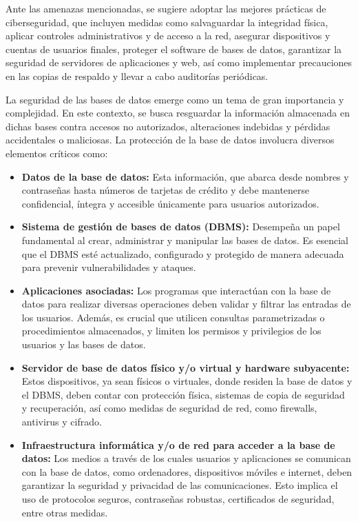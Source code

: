 \documentclass[11pt]{report}
\begin{document}
Ante las amenazas mencionadas, se sugiere adoptar las mejores prácticas de
ciberseguridad, que incluyen medidas como salvaguardar la integridad física, aplicar
controles administrativos y de acceso a la red, asegurar dispositivos y cuentas de usuarios
finales, proteger el software de bases de datos, garantizar la seguridad de servidores de
aplicaciones y web, así como implementar precauciones en las copias de respaldo y llevar a
cabo auditorías periódicas.

La seguridad de las bases de datos emerge como un tema de gran importancia y
complejidad. En este contexto, se busca resguardar la información almacenada en dichas
bases contra accesos no autorizados, alteraciones indebidas y pérdidas accidentales o
maliciosas. La protección de la base de datos involucra diversos elementos críticos como:

\begin{itemize}
\item \textbf{Datos de la base de datos:} Esta información, que abarca desde nombres y
contraseñas hasta números de tarjetas de crédito y debe mantenerse confidencial,
íntegra y accesible únicamente para usuarios autorizados.
\item \textbf{Sistema de gestión de bases de datos (DBMS):} Desempeña un papel fundamental
al crear, administrar y manipular las bases de datos. Es esencial que el DBMS esté
actualizado, configurado y protegido de manera adecuada para prevenir
vulnerabilidades y ataques.
\item \textbf{Aplicaciones asociadas:} Los programas que interactúan con la base de datos para
realizar diversas operaciones deben validar y filtrar las entradas de los usuarios.
Además, es crucial que utilicen consultas parametrizadas o procedimientos
almacenados, y limiten los permisos y privilegios de los usuarios y las bases de
datos.
\item \textbf{Servidor de base de datos físico y/o virtual y hardware subyacente:} Estos
dispositivos, ya sean físicos o virtuales, donde residen la base de datos y el DBMS,
deben contar con protección física, sistemas de copia de seguridad y recuperación,
así como medidas de seguridad de red, como firewalls, antivirus y cifrado.
\item \textbf{Infraestructura informática y/o de red para acceder a la base de datos:} Los medios a
través de los cuales usuarios y aplicaciones se comunican con la base de datos,
como ordenadores, dispositivos móviles e internet, deben garantizar la seguridad y
privacidad de las comunicaciones. Esto implica el uso de protocolos seguros,
contraseñas robustas, certificados de seguridad, entre otras medidas.
\end{itemize}
\end{document}
